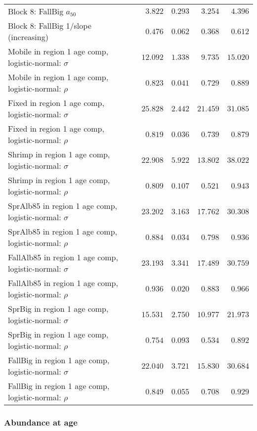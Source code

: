 \documentclass[
]{article}
\begin{document}
\begin{landscape}
\begin{longtable}[t]{lrrrr}
\addlinespace
Block 8: FallBig $a_{50}$ & $3.822$ & $0.293$ & $3.254$ & $4.396$\\
Block 8: FallBig 1/slope (increasing) & $0.476$ & $0.062$ & $0.368$ & $0.612$\\
Mobile in region 1 age comp, logistic-normal: $\sigma$ & $12.092$ & $1.338$ & $9.735$ & $15.020$\\
Mobile in region 1 age comp, logistic-normal: $\rho$ & $0.823$ & $0.041$ & $0.729$ & $0.889$\\
Fixed in region 1 age comp, logistic-normal: $\sigma$ & $25.828$ & $2.442$ & $21.459$ & $31.085$\\
\addlinespace
Fixed in region 1 age comp, logistic-normal: $\rho$ & $0.819$ & $0.036$ & $0.739$ & $0.879$\\
Shrimp in region 1 age comp, logistic-normal: $\sigma$ & $22.908$ & $5.922$ & $13.802$ & $38.022$\\
Shrimp in region 1 age comp, logistic-normal: $\rho$ & $0.809$ & $0.107$ & $0.521$ & $0.943$\\
SprAlb85 in region 1 age comp, logistic-normal: $\sigma$ & $23.202$ & $3.163$ & $17.762$ & $30.308$\\
SprAlb85 in region 1 age comp, logistic-normal: $\rho$ & $0.884$ & $0.034$ & $0.798$ & $0.936$\\
\addlinespace
FallAlb85 in region 1 age comp, logistic-normal: $\sigma$ & $23.193$ & $3.341$ & $17.489$ & $30.759$\\
FallAlb85 in region 1 age comp, logistic-normal: $\rho$ & $0.936$ & $0.020$ & $0.883$ & $0.966$\\
SprBig in region 1 age comp, logistic-normal: $\sigma$ & $15.531$ & $2.750$ & $10.977$ & $21.973$\\
SprBig in region 1 age comp, logistic-normal: $\rho$ & $0.754$ & $0.093$ & $0.534$ & $0.892$\\
FallBig in region 1 age comp, logistic-normal: $\sigma$ & $22.040$ & $3.721$ & $15.830$ & $30.684$\\
\addlinespace
FallBig in region 1 age comp, logistic-normal: $\rho$ & $0.849$ & $0.055$ & $0.708$ & $0.929$\\*
\end{longtable}
\end{landscape}

\hypertarget{abundance-at-age}{%
\subsubsection{Abundance at age}\label{abundance-at-age}}
\end{document}
